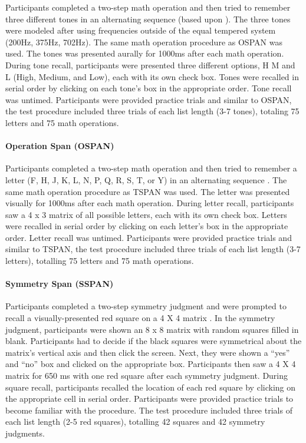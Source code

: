 \documentclass[12pt,]{book}
\let\oldparagraph\paragraph
\renewcommand{\paragraph}[1]{\oldparagraph{#1}\mbox{}}
\begin{document}
Participants completed a two-step math operation and then tried to remember three different tones in an alternating sequence (based upon \citet{unsworthAutomatedVersionOperation2005}).
The three tones were modeled after \citet{liEstimatingWorkingMemory2013} using frequencies outside of the equal tempered system (200Hz, 375Hz, 702Hz).
The same math operation procedure as OSPAN was used.
The tones was presented aurally for 1000ms after each math operation.
During tone recall, participants were presented three different options, H M and L (High, Medium, and Low), each with its own check box.
Tones were recalled in serial order by clicking on each tone's box in the appropriate order.
Tone recall was untimed.
Participants were provided practice trials and similar to OSPAN, the test procedure included three trials of each list length (3-7 tones), totaling 75 letters and 75 math operations.

\hypertarget{operation-span-ospan}{%
\paragraph{Operation Span (OSPAN)}\label{operation-span-ospan}}

Participants completed a two-step math operation and then tried to remember a letter (F, H, J, K, L, N, P, Q, R, S, T, or
Y) in an alternating sequence \citep{unsworthAutomatedVersionOperation2005}.
The same math operation procedure as TSPAN was used.
The letter was presented visually for 1000ms after each math
operation.
During letter recall, participants saw a 4 x 3 matrix of all possible letters, each with its own check box.
Letters were recalled in serial order by clicking on each letter's box in the appropriate order.
Letter recall was untimed.
Participants were provided practice trials and similar to TSPAN, the test procedure included three trials of each list length (3-7 letters), totalling 75 letters and 75 math operations.

\hypertarget{symmetry-span-sspan}{%
\paragraph{Symmetry Span (SSPAN)}\label{symmetry-span-sspan}}

Participants completed a two-step symmetry judgment and were prompted to recall a visually-presented red square on a 4 X 4 matrix \citep{unsworthAutomatedVersionOperation2005}.
In the symmetry judgment, participants were shown an 8 x 8 matrix with random squares filled in blank.
Participants had to decide if the black squares were symmetrical about the matrix's vertical axis and then click the screen.
Next, they were shown a ``yes'' and ``no'' box and clicked on the appropriate box.
Participants then saw a 4 X 4 matrix for 650 ms with one red square after each symmetry judgment.
During square recall, participants recalled the location of each red square by clicking on the appropriate cell in serial order.
Participants were provided practice trials to become familiar with the procedure.
The test procedure included three trials of each list length (2-5 red squares), totalling 42 squares and 42 symmetry judgments.
\end{document}
